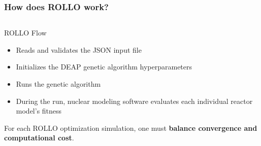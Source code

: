 \begin{frame}
    \frametitle{How does ROLLO work?}
    \begin{columns}
        \begin{column}{0.7\textwidth}
            ROLLO Flow 
            \begin{itemize}
                \item Reads and validates the JSON input file
                \item Initializes the \acrfull{DEAP} genetic algorithm hyperparameters
                \item Runs the genetic algorithm  
                \item During the run, nuclear modeling software evaluates each individual 
                reactor model's fitness
            \end{itemize}

            \vspace{0.2cm}
            For each ROLLO optimization simulation, one must \textbf{balance convergence and 
            computational cost}. 


\end{column}
\end{columns}
\end{frame}
